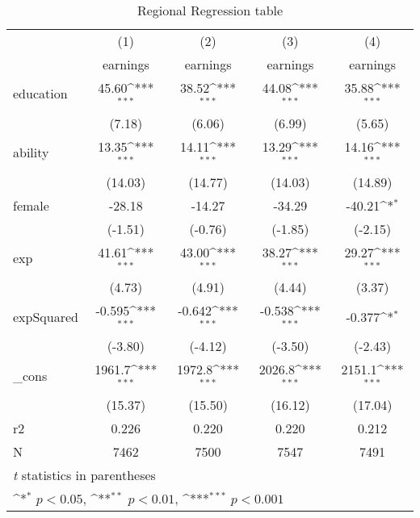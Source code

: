 \begin{table}[htbp]\centering
\def\sym#1{\ifmmode^{#1}\else\(^{#1}\)\fi}
\caption{Regional Regression table\label{tab1}}
\begin{tabular}{l*{4}{c}}
\hline\hline
            &\multicolumn{1}{c}{(1)}&\multicolumn{1}{c}{(2)}&\multicolumn{1}{c}{(3)}&\multicolumn{1}{c}{(4)}\\
            &\multicolumn{1}{c}{earnings}&\multicolumn{1}{c}{earnings}&\multicolumn{1}{c}{earnings}&\multicolumn{1}{c}{earnings}\\
\hline
education   &       45.60\sym{***}&       38.52\sym{***}&       44.08\sym{***}&       35.88\sym{***}\\
            &      (7.18)         &      (6.06)         &      (6.99)         &      (5.65)         \\
[1em]
ability     &       13.35\sym{***}&       14.11\sym{***}&       13.29\sym{***}&       14.16\sym{***}\\
            &     (14.03)         &     (14.77)         &     (14.03)         &     (14.89)         \\
[1em]
female      &      -28.18         &      -14.27         &      -34.29         &      -40.21\sym{*}  \\
            &     (-1.51)         &     (-0.76)         &     (-1.85)         &     (-2.15)         \\
[1em]
exp         &       41.61\sym{***}&       43.00\sym{***}&       38.27\sym{***}&       29.27\sym{***}\\
            &      (4.73)         &      (4.91)         &      (4.44)         &      (3.37)         \\
[1em]
expSquared  &      -0.595\sym{***}&      -0.642\sym{***}&      -0.538\sym{***}&      -0.377\sym{*}  \\
            &     (-3.80)         &     (-4.12)         &     (-3.50)         &     (-2.43)         \\
[1em]
\_cons      &      1961.7\sym{***}&      1972.8\sym{***}&      2026.8\sym{***}&      2151.1\sym{***}\\
            &     (15.37)         &     (15.50)         &     (16.12)         &     (17.04)         \\
\hline
r2          &       0.226         &       0.220         &       0.220         &       0.212         \\
N           &        7462         &        7500         &        7547         &        7491         \\
\hline\hline
\multicolumn{5}{l}{\footnotesize \textit{t} statistics in parentheses}\\
\multicolumn{5}{l}{\footnotesize \sym{*} \(p<0.05\), \sym{**} \(p<0.01\), \sym{***} \(p<0.001\)}\\
\end{tabular}
\end{table}

